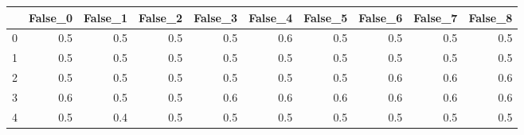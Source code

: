 \begin{tabular}{lrrrrrrrrr}
\toprule
{} &  False\_0 &  False\_1 &  False\_2 &  False\_3 &  False\_4 &  False\_5 &  False\_6 &  False\_7 &  False\_8 \\ \hline
\midrule
0 &      0.5 &      0.5 &      0.5 &      0.5 &      0.6 &      0.5 &      0.5 &      0.5 &      0.5 \\ \hline
1 &      0.5 &      0.5 &      0.5 &      0.5 &      0.5 &      0.5 &      0.5 &      0.5 &      0.5 \\ \hline
2 &      0.5 &      0.5 &      0.5 &      0.5 &      0.5 &      0.5 &      0.6 &      0.6 &      0.6 \\ \hline
3 &      0.6 &      0.5 &      0.5 &      0.6 &      0.6 &      0.6 &      0.6 &      0.6 &      0.6 \\ \hline
4 &      0.5 &      0.4 &      0.5 &      0.5 &      0.5 &      0.5 &      0.5 &      0.5 &      0.5 \\ \hline
\bottomrule
\end{tabular}
